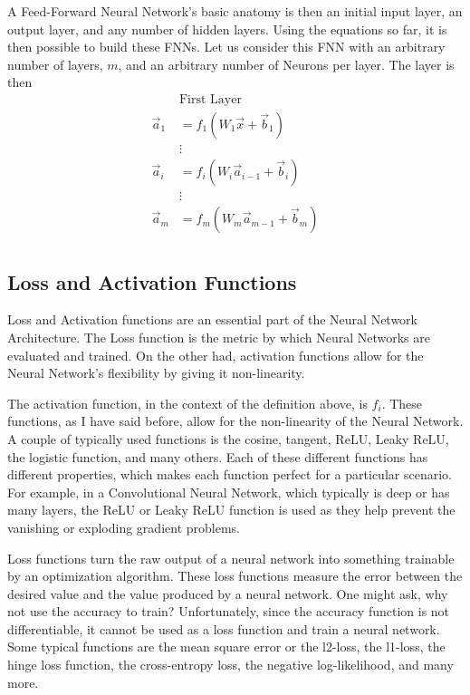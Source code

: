 A Feed-Forward Neural Network's basic anatomy is then an initial input layer, an output layer, and any number of hidden layers. Using the equations so far, it is then possible to build these FNNs. Let us consider this FNN with an arbitrary number of layers, $m$, and an arbitrary number of Neurons per layer. The layer is then 
\begin{align*}
&\text{First Layer} \\
\vec{a}_1 &= f_1(W_1\vec{x} +\vec{b}_1 )\\
&\vdots\\
\vec{a}_i &= f_i(W_i\vec{a}_{i-1}+\vec{b}_i)\\
&\vdots\\
\vec{a}_m &= f_m(W_m\vec{a}_{m-1}+\vec{b}_m)\\
\end{align*}

\subsection{Loss and Activation Functions}

Loss and Activation functions are an essential part of the Neural Network Architecture. The Loss function is the metric by which Neural Networks are evaluated and trained. On the other had, activation functions allow for the Neural Network's flexibility by giving it non-linearity.

The activation function, in the context of the definition above, is $f_i$. These functions, as I have said before, allow for the non-linearity of the Neural Network. A couple of typically used functions is the cosine, tangent, ReLU, Leaky ReLU, the logistic function, and many others. Each of these different functions has different properties, which makes each function perfect for a particular scenario. For example, in a Convolutional Neural Network, which typically is deep or has many layers, the ReLU or Leaky ReLU function is used as they help prevent the vanishing or exploding gradient problems.

Loss functions turn the raw output of a neural network into something trainable by an optimization algorithm. These loss functions measure the error between the desired value and the value produced by a neural network. One might ask, why not use the accuracy to train? Unfortunately, since the accuracy function is not differentiable, it cannot be used as a loss function and train a neural network. Some typical functions are the mean square error or the l2-loss, the l1-loss, the hinge loss function, the cross-entropy loss, the negative log-likelihood, and many more.

